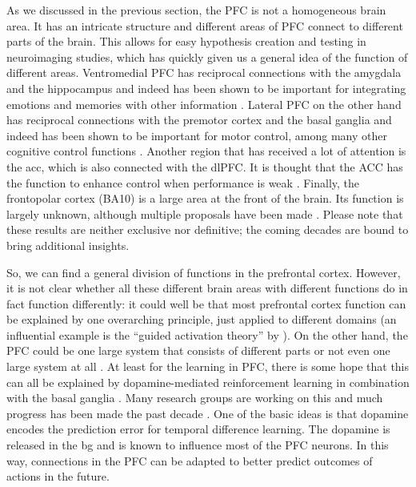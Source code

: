 \documentclass[10pt,a4paper]{report}
\begin{document}
As we discussed in the previous section, the PFC is not a homogeneous brain area. It has an intricate structure and different areas of PFC connect to different parts of the brain. This allows for easy hypothesis creation and testing in neuroimaging studies, which has quickly given us a general idea of the function of different areas. Ventromedial PFC has reciprocal connections with the amygdala and the hippocampus and indeed has been shown to be important for integrating emotions and memories with other information \citep{Bechara1999, Milad2007}. Lateral PFC on the other hand has reciprocal connections with the premotor cortex and the basal ganglia and indeed has been shown to be important for motor control, among many other cognitive control functions \citep{Ridderinkhof2004, Tanji2008, Goldman-Rakic2002, D'Esposito2002}. Another region that has received a lot of attention is the \gls{acc}, which is also connected with the dlPFC. It is thought that the ACC has the function to enhance control when performance is weak \citep{Silton2010}. Finally, the frontopolar cortex (BA10) is a large area at the front of the brain. Its function is largely unknown, although multiple proposals have been made \citep{Simons2006}. Please note that these results are neither exclusive nor definitive; the coming decades are bound to bring additional insights. 

So, we can find a general division of functions in the prefrontal cortex. However, it is not clear whether all these different brain areas with different functions do in fact function differently: it could well be that most prefrontal cortex function can be explained by one overarching principle, just applied to different domains (an influential example is the ``guided activation theory'' by \citet{Miller2001}). On the other hand, the PFC could be one large system that consists of different parts or not even one large system at all \citep{Simons2005}. At least for the learning in PFC, there is some hope that this can all be explained by dopamine-mediated reinforcement learning in combination with the basal ganglia \citep{Schultz2010}. Many research groups are working on this and much progress has been made the past decade \citep{Glascher2010, Botvinick2009}. One of the basic ideas is that dopamine encodes the prediction error for temporal difference learning. The dopamine is released in the \gls{bg} and is known to influence most of the PFC neurons. In this way, connections in the PFC can be adapted to better predict outcomes of actions in the future.
\end{document}
